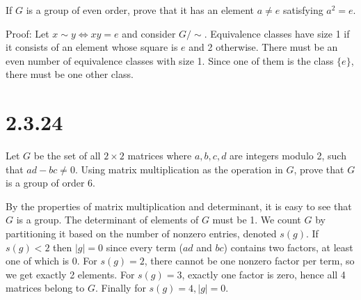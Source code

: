 \documentclass{article}
\begin{document}
If $G$ is a group of even order, prove that it has an element $a \ne e$ satisfying $a^2 = e$.

Proof: Let $x \sim y \iff xy = e$ and consider $G / \sim$. Equivalence classes have size 1 if it consists of an element whose square is $e$ and 2 otherwise. There must be an even number of equivalence classes with size 1. Since one of them is the class $\{e\}$, there must be one other class.

\section*{2.3.24}

Let $G$ be the set of all $2 \times 2$ matrices where $a, b, c, d$ are integers modulo 2, such that $ad - bc \ne 0$. Using matrix multiplication as the operation in $G$, prove that $G$ is a group of order 6.

By the properties of matrix multiplication and determinant, it is easy to see that $G$ is a group. The determinant of elements of $G$ must be 1. We count $G$ by partitioning it based on the number of nonzero entries, denoted $s(g)$. If $s(g) < 2$ then $|g| = 0$ since every term ($ad$ and $bc$) contains two factors, at least one of which is 0. For $s(g) = 2$, there cannot be one nonzero factor per term, so we get exactly 2 elements. For $s(g) = 3$, exactly one factor is zero, hence all 4 matrices belong to $G$. Finally for $s(g) = 4, |g| = 0$.
\end{document}
